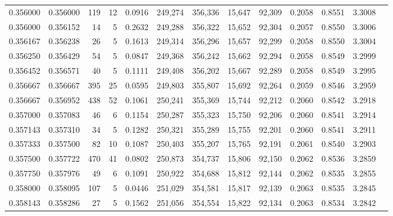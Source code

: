 \begin{tabular}{rrrrrrrrrrrrr}
0.356000 & 0.356000 &   119 &  12 &                                     0.0916 & 249,274 & 356,336 &  15,647 &  92,309 & 0.2058 & 0.8551 & 3.3008 \\
0.356000 & 0.356152 &    14 &   5 &                                     0.2632 & 249,288 & 356,322 &  15,652 &  92,304 & 0.2057 & 0.8550 & 3.3006 \\
0.356167 & 0.356238 &    26 &   5 &                                     0.1613 & 249,314 & 356,296 &  15,657 &  92,299 & 0.2058 & 0.8550 & 3.3004 \\
0.356250 & 0.356429 &    54 &   5 &                                     0.0847 & 249,368 & 356,242 &  15,662 &  92,294 & 0.2058 & 0.8549 & 3.2999 \\
0.356452 & 0.356571 &    40 &   5 &                                     0.1111 & 249,408 & 356,202 &  15,667 &  92,289 & 0.2058 & 0.8549 & 3.2995 \\
0.356667 & 0.356667 &   395 &  25 &                                     0.0595 & 249,803 & 355,807 &  15,692 &  92,264 & 0.2059 & 0.8546 & 3.2959 \\
0.356667 & 0.356952 &   438 &  52 &                                     0.1061 & 250,241 & 355,369 &  15,744 &  92,212 & 0.2060 & 0.8542 & 3.2918 \\
0.357000 & 0.357083 &    46 &   6 &                                     0.1154 & 250,287 & 355,323 &  15,750 &  92,206 & 0.2060 & 0.8541 & 3.2914 \\
0.357143 & 0.357310 &    34 &   5 &                                     0.1282 & 250,321 & 355,289 &  15,755 &  92,201 & 0.2060 & 0.8541 & 3.2911 \\
0.357333 & 0.357500 &    82 &  10 &                                     0.1087 & 250,403 & 355,207 &  15,765 &  92,191 & 0.2061 & 0.8540 & 3.2903 \\
0.357500 & 0.357722 &   470 &  41 &                                     0.0802 & 250,873 & 354,737 &  15,806 &  92,150 & 0.2062 & 0.8536 & 3.2859 \\
0.357750 & 0.357976 &    49 &   6 &                                     0.1091 & 250,922 & 354,688 &  15,812 &  92,144 & 0.2062 & 0.8535 & 3.2855 \\
0.358000 & 0.358095 &   107 &   5 &                                     0.0446 & 251,029 & 354,581 &  15,817 &  92,139 & 0.2063 & 0.8535 & 3.2845 \\
0.358143 & 0.358286 &    27 &   5 &                                     0.1562 & 251,056 & 354,554 &  15,822 &  92,134 & 0.2063 & 0.8534 & 3.2842 \\

\end{tabular}
